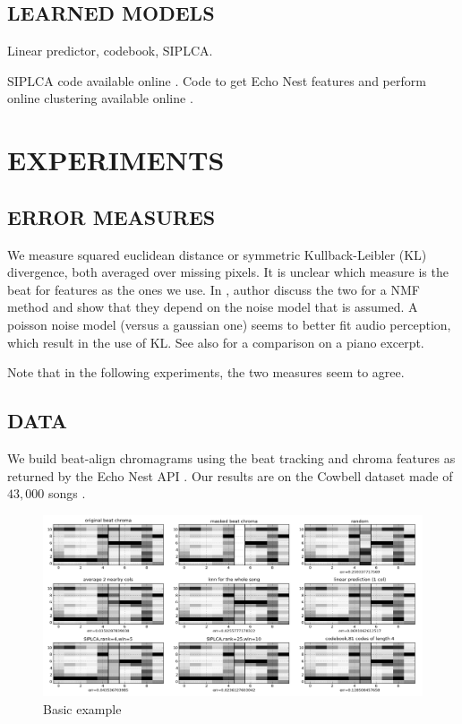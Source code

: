 \documentclass{article}
\begin{document}
\subsection{LEARNED MODELS}
\label{ssec:learnedmodels}

Linear predictor, codebook, SIPLCA.

SIPLCA code available online \cite{Weiss2010}. Code to get Echo Nest features and perform
online clustering available online \cite{Bertin-Mahieux2010a}.

\section{EXPERIMENTS}
\label{sec:experiments}

\subsection{ERROR MEASURES}
\label{ssec:errmeasures}
We measure squared euclidean distance or symmetric Kullback-Leibler (KL) divergence,
both averaged over missing pixels. It is unclear which measure is the beat for features
as the ones we use. In \cite{Sajda2003}, author discuss the two for
a NMF method and show that they depend on the noise model that is assumed.
A poisson noise model (versus a gaussian one) seems to better fit audio perception, 
which result in the use of KL. See also \cite{Fevotte2009} for a comparison on a piano
excerpt.

Note that in the following experiments, the two measures seem to agree.

\subsection{DATA}
\label{ssec:data}
We build beat-align chromagrams using the beat tracking and chroma features as
returned by the Echo Nest API \cite{EchoNest}. Our results are on the Cowbell
dataset made of $43,000$ songs \cite{Bertin-Mahieux2010a}.

\begin{figure}[t]
\begin{center}
\includegraphics[width=.9\columnwidth]{imputation}
\end{center}
\caption{Basic example}
\label{fig:imputation}
\end{figure}
\end{document}
